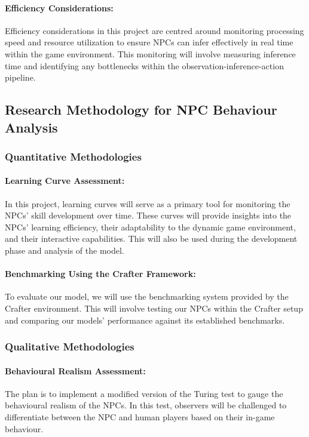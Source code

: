 \paragraph{Efficiency Considerations:}
Efficiency considerations in this project are centred around monitoring processing speed and resource utilization to ensure NPCs can infer effectively in real time within the game environment. This monitoring will involve measuring inference time and identifying any bottlenecks within the observation-inference-action pipeline. 

\subsection{Research Methodology for NPC Behaviour Analysis}
\subsubsection{Quantitative Methodologies}
\paragraph{Learning Curve Assessment:}
In this project, learning curves will serve as a primary tool for monitoring the NPCs' skill development over time. \cite{Crafter} These curves will provide insights into the NPCs' learning efficiency, their adaptability to the dynamic game environment, and their interactive capabilities. This will also be used during the development phase and analysis of the model.

\paragraph{Benchmarking Using the Crafter Framework:}
To evaluate our model, we will use the benchmarking system provided by the Crafter environment. This will involve testing our NPCs within the Crafter setup and comparing our models' performance against its established benchmarks. \cite{Crafter}

\subsubsection{Qualitative Methodologies}

\paragraph{Behavioural Realism Assessment:}
The plan is to implement a modified version of the Turing test to gauge the behavioural realism of the NPCs. In this test, observers will be challenged to differentiate between the NPC and human players based on their in-game behaviour. \cite{Turing_Navigation}

